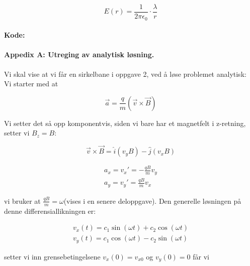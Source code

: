\documentclass[a4paper,norsk, 10pt]{article}
\begin{document}
\begin{equation}
E(r) = \frac{1}{2\pi \epsilon_0}\cdot \frac{\lambda}{r}
\end{equation}

\newpage


\paragraph*{Kode:}
\hspace{5mm}



\newpage


\paragraph*{Appedix A: Utreging av analytisk løsning.}
\hspace{5mm}

Vi skal vise at vi får en sirkelbane i oppgave 2, ved å løse problemet analytisk:\\

Vi starter med at

\begin{equation}
\vec{a} = \frac{q}{m}(\vec{v} \times \vec{B})
\end{equation}

Vi setter det så opp komponentvis, siden vi bare har et magnetfelt i z-retning, setter vi $B_z = B$:

$$
\vec{v} \times \vec{B} = \hat{i}(v_yB) - \hat{j}(v_xB)
$$

\begin{equation}
\begin{split}
a_x = v_x' = - \frac{qB}{m}v_y
\\
a_y = v_y' =  \frac{qB}{m}v_x
\end{split}
\end{equation}

vi bruker at $\frac{qB}{m} = \omega$(vises i en senere deloppgave). Den generelle løsningen på denne differensiallikningen er:

\begin{equation}
\begin{split}
v_x(t) = c_1\sin(\omega t) + c_2\cos(\omega t)
\\
v_y(t) = c_1\cos(\omega t) - c_2\sin(\omega t)
\end{split}
\end{equation}

setter vi inn grensebetingelsene $v_x(0) = v_{x0}$ og $v_y(0) = 0$ får vi 
\end{document}
